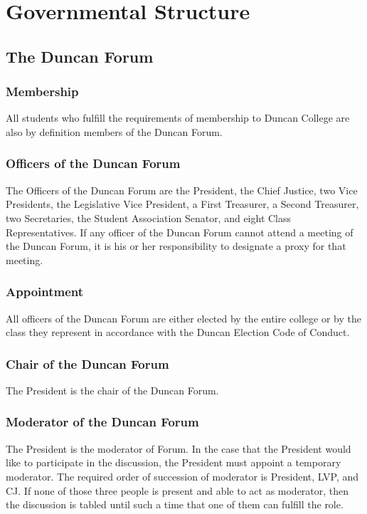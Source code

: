 \documentclass[USletter,12pt]{article}
\begin{document}
\section{Governmental Structure}



\subsection{The Duncan Forum}

\subsubsection{Membership}
All students who fulfill the requirements of membership to Duncan College are also by definition members of the Duncan Forum.

\subsubsection{Officers of the Duncan Forum}
The Officers of the Duncan Forum are the President, the Chief Justice, two Vice Presidents, the Legislative Vice President, a First Treasurer, a Second Treasurer, two Secretaries, the Student Association Senator, and eight Class Representatives.  If any officer of the Duncan Forum cannot attend a meeting of the Duncan Forum, it is his or her responsibility to designate a proxy for that meeting.

\subsubsection{Appointment}
All officers of the Duncan Forum are either elected by the entire college or by the class they represent in accordance with the Duncan Election Code of Conduct.

\subsubsection{Chair of the Duncan Forum}
The President is the chair of the Duncan Forum.

\subsubsection{Moderator of the Duncan Forum}
The President is the moderator of Forum.  In the case that the President would like to participate in the discussion, the President must appoint a temporary moderator.  The required order of succession of moderator is President, LVP, and CJ.  If none of those three people is present and able to act as moderator, then the discussion is tabled until such a time that one of them can fulfill the role.
\end{document}

